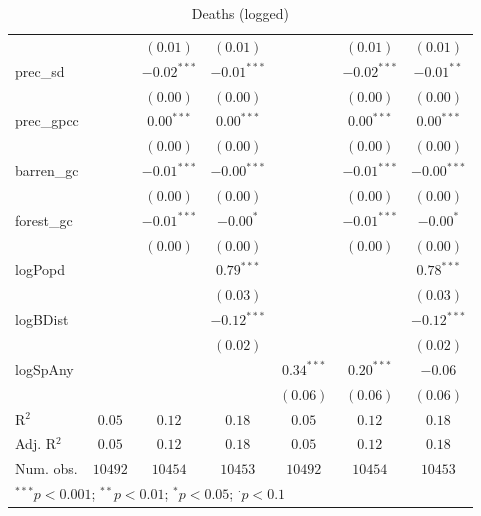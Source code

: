 \begin{sidewaystable}
\begin{center}
{\begin{tabular}{l c c c c c c}
                &               & $(0.01)$       & $(0.01)$      &               & $(0.01)$      & $(0.01)$        \\
prec\_sd        &               & $-0.02^{***}$  & $-0.01^{***}$ &               & $-0.02^{***}$ & $-0.01^{**}$    \\
                &               & $(0.00)$       & $(0.00)$      &               & $(0.00)$      & $(0.00)$        \\
prec\_gpcc      &               & $0.00^{***}$   & $0.00^{***}$  &               & $0.00^{***}$  & $0.00^{***}$    \\
                &               & $(0.00)$       & $(0.00)$      &               & $(0.00)$      & $(0.00)$        \\
barren\_gc      &               & $-0.01^{***}$  & $-0.00^{***}$ &               & $-0.01^{***}$ & $-0.00^{***}$   \\
                &               & $(0.00)$       & $(0.00)$      &               & $(0.00)$      & $(0.00)$        \\
forest\_gc      &               & $-0.01^{***}$  & $-0.00^{*}$   &               & $-0.01^{***}$ & $-0.00^{*}$     \\
                &               & $(0.00)$       & $(0.00)$      &               & $(0.00)$      & $(0.00)$        \\
logPopd         &               &                & $0.79^{***}$  &               &               & $0.78^{***}$    \\
                &               &                & $(0.03)$      &               &               & $(0.03)$        \\
logBDist        &               &                & $-0.12^{***}$ &               &               & $-0.12^{***}$   \\
                &               &                & $(0.02)$      &               &               & $(0.02)$        \\
logSpAny        &               &                &               & $0.34^{***}$  & $0.20^{***}$  & $-0.06$         \\
                &               &                &               & $(0.06)$      & $(0.06)$      & $(0.06)$        \\
\hline
R$^2$           & $0.05$        & $0.12$         & $0.18$        & $0.05$        & $0.12$        & $0.18$          \\
Adj. R$^2$      & $0.05$        & $0.12$         & $0.18$        & $0.05$        & $0.12$        & $0.18$          \\
Num. obs.       & $10492$       & $10454$        & $10453$       & $10492$       & $10454$       & $10453$         \\
\hline
\multicolumn{7}{l}{\scriptsize{$^{***}p<0.001$; $^{**}p<0.01$; $^{*}p<0.05$; $^{\cdot}p<0.1$}}
\end{tabular}
}
\caption{Deaths (logged)}
\label{logDeaths}
\end{center}
\end{sidewaystable}
